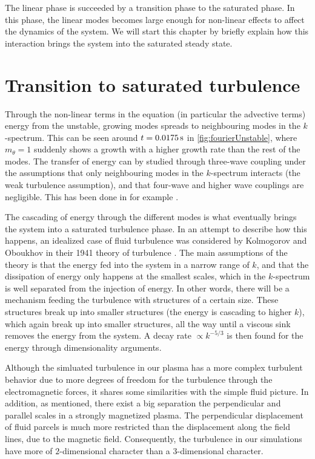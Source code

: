 %
The linear phase is succeeded by a transition phase to the saturated phase.
In this phase, the linear modes becomes large enough for non-linear effects to affect the dynamics of the system.
We will start this chapter by briefly explain how this interaction brings the system into the saturated steady state.

\section{Transition to saturated turbulence}
Through the non-linear terms in the equation (in particular the advective terms) energy from the unstable, growing modes spreads to neighbouring modes in the $k$-spectrum.
This can be seen around $t=0.0175\, \text{s}$ in \cref{fig:fourierUnstable}, where $m_\theta=1$ suddenly shows a growth with a higher growth rate than the rest of the modes.
The transfer of energy can by studied through three-wave coupling under the assumptions that only neighbouring modes in the $k$-spectrum interacts (the weak turbulence assumption), and that four-wave and higher wave couplings are negligible.
This has been done in for example \cite{Ritz1989,Knorr1990}.

The cascading of energy through the different modes is what eventually brings the system into a saturated turbulence phase.
In an attempt to describe how this happens, an idealized case of fluid turbulence was considered by Kolmogorov and Oboukhov in their 1941 theory of turbulence \cite{Kolmogorov1962}.
The main assumptions of the theory is that the energy fed into the system in a narrow range of $k$, and that the dissipation of energy only happens at the smallest scales, which in the $k$-spectrum is well separated from the injection of energy.
In other words, there will be a mechanism feeding the turbulence with structures of a certain size.
These structures break up into smaller structures (the energy is cascading to higher $k$), which again break up into smaller structures, all the way until a viscous sink removes the energy from the system.
A decay rate $\propto k^{-5/3}$ is then found for the energy through dimensionality arguments.

Although the simluated turbulence in our plasma has a more complex turbulent behavior due to more degrees of freedom for the turbulence through the electromagnetic forces, it shares some similarities with the simple fluid picture.
In addition, as mentioned, there exist a big separation the perpendicular and parallel scales in a strongly magnetized plasma.
The perpendicular displacement of fluid parcels is much more restricted than the displacement along the field lines, due to the magnetic field.
Consequently, the turbulence in our simulations have more of $2$-dimensional character than a $3$-dimensional character.

